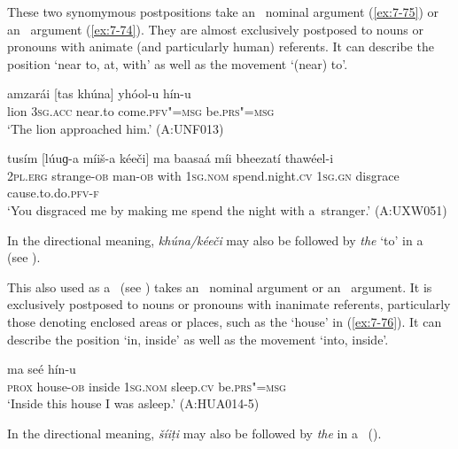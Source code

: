  These two synomymous postpositions take an~ nominal argument (\ref{ex:7-75}) or an~  argument (\ref{ex:7-74}). They are almost exclusively postposed to nouns or pronouns with animate (and particularly human) referents. It can describe the position `near to, at, with' as well as the movement `(near) to'. 

\begin{exe}
\ex
\label{ex:7-74}
\gll amzarái [tas khúna] yhóol-u hín-u \\
lion \textsc{3sg.acc} near.to come.\textsc{pfv"=msg } be.\textsc{prs"=msg} \\
\glt `The lion approached him.' (A:UNF013)
\end{exe}
\begin{exe}
\ex
\label{ex:7-75}
\gll tusím [lúuɡ-a míiš-a kéeči] ma baasaá míi bheezatí thawéel-i \\
\textsc{2pl.erg} strange-\textsc{ob} man-\textsc{ob} with \textsc{1sg.nom} spend.night.\textsc{cv} \textsc{1sg.gn} disgrace cause.to.do.\textsc{pfv-f} \\
\glt `You disgraced me by making me spend the night with a~stranger.' (A:UXW051)
\end{exe}

In the directional meaning, \textit{khúna/kéeči} may also be followed by \textit{the} `to' in a~ (see ).


 This  also used as a~ (see ) takes an~ nominal argument or an~  argument. It is exclusively postposed to nouns or pronouns with inanimate referents, particularly those denoting enclosed areas or places, such as the `house' in (\ref{ex:7-76}). It can describe the position `in, inside' as well as the movement `into, inside'.

\begin{exe}
\ex
\label{ex:7-76}
 ma seé hín-u  \\
\textsc{prox} house-\textsc{ob}  inside \textsc{1sg.nom} sleep.\textsc{cv} be.\textsc{prs"=msg}  \\
\glt `Inside this house I was asleep.' (A:HUA014-5)
\end{exe}

In the directional meaning, \textit{šíiṭi} may also be followed by \textit{the} in a~ ().


